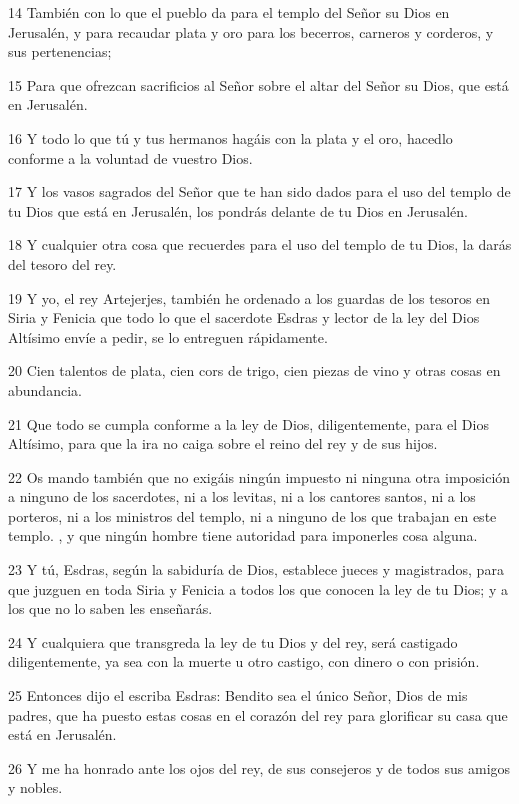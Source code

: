 \par 14 También con lo que el pueblo da para el templo del Señor su Dios en Jerusalén, y para recaudar plata y oro para los becerros, carneros y corderos, y sus pertenencias;
\par 15 Para que ofrezcan sacrificios al Señor sobre el altar del Señor su Dios, que está en Jerusalén.
\par 16 Y todo lo que tú y tus hermanos hagáis con la plata y el oro, hacedlo conforme a la voluntad de vuestro Dios.
\par 17 Y los vasos sagrados del Señor que te han sido dados para el uso del templo de tu Dios que está en Jerusalén, los pondrás delante de tu Dios en Jerusalén.
\par 18 Y cualquier otra cosa que recuerdes para el uso del templo de tu Dios, la darás del tesoro del rey.
\par 19 Y yo, el rey Artejerjes, también he ordenado a los guardas de los tesoros en Siria y Fenicia que todo lo que el sacerdote Esdras y lector de la ley del Dios Altísimo envíe a pedir, se lo entreguen rápidamente.
\par 20 Cien talentos de plata, cien cors de trigo, cien piezas de vino y otras cosas en abundancia.
\par 21 Que todo se cumpla conforme a la ley de Dios, diligentemente, para el Dios Altísimo, para que la ira no caiga sobre el reino del rey y de sus hijos.
\par 22 Os mando también que no exigáis ningún impuesto ni ninguna otra imposición a ninguno de los sacerdotes, ni a los levitas, ni a los cantores santos, ni a los porteros, ni a los ministros del templo, ni a ninguno de los que trabajan en este templo. , y que ningún hombre tiene autoridad para imponerles cosa alguna.
\par 23 Y tú, Esdras, según la sabiduría de Dios, establece jueces y magistrados, para que juzguen en toda Siria y Fenicia a todos los que conocen la ley de tu Dios; y a los que no lo saben les enseñarás.
\par 24 Y cualquiera que transgreda la ley de tu Dios y del rey, será castigado diligentemente, ya sea con la muerte u otro castigo, con dinero o con prisión.
\par 25 Entonces dijo el escriba Esdras: Bendito sea el único Señor, Dios de mis padres, que ha puesto estas cosas en el corazón del rey para glorificar su casa que está en Jerusalén.
\par 26 Y me ha honrado ante los ojos del rey, de sus consejeros y de todos sus amigos y nobles.
